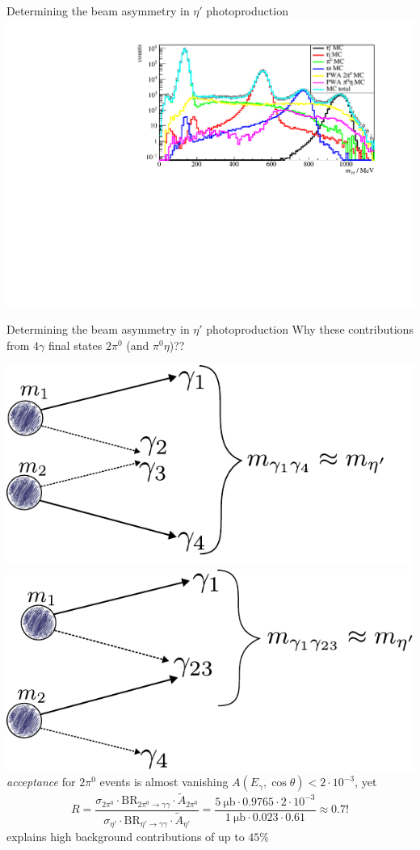 \documentclass[11pt,aspectratio=169,dvipsnames]{beamer}
\begin{document}
\begin{frame}{Determining the beam asymmetry in $\eta'$ photoproduction}
	\includegraphics[width=\linewidth]{../../figs/hydrogen/invm_global.pdf}
\end{frame}
\begin{frame}{Determining the beam asymmetry in $\eta'$ photoproduction}
	Why these contributions from $4\gamma$ final states $2\pi^0$ (and $\pi^0\eta$)??
	
	\includegraphics[width=.49\linewidth]{../../figs/inkscape/mcgammas1.pdf}
	\includegraphics[width=.49\linewidth]{../../figs/inkscape/mcgammas2.pdf}
	\emph{acceptance} for $2\pi^0$ events is almost vanishing $A(E_\gamma,\cos\theta)<2\cdot10^{-3}$, yet $$R=\frac{\sigma_{2\pi^0}\cdot\text{BR}_{2\pi^0\to\gamma\gamma}\cdot\tilde{A}_{2\pi^0}}{\sigma_{\eta'}\cdot\text{BR}_{\eta'\to\gamma\gamma}\cdot\tilde{A}_{\eta'}}=\frac{\SI{5}{\micro\barn}\cdot0.9765\cdot2\cdot10^{-3}}{\SI{1}{\micro\barn}\cdot0.023\cdot0.61}\approx0.7!$$
	explains high background contributions of up to $45\%$
	\begin{flushright}
		\cites{pdg,etap_cs,2pi0_cs}
	\end{flushright}
\end{frame}
\end{document}
